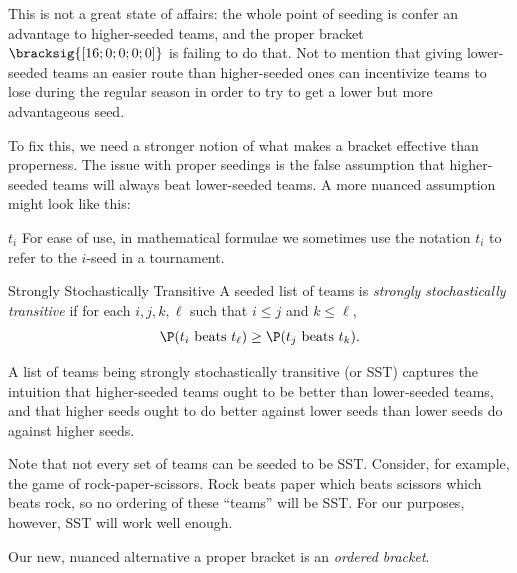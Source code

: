 {This is not a great state of affairs: the whole point of seeding is confer an advantage to higher-seeded teams, and the proper bracket $\bracksig{[16; 0; 0; 0; 0]}$ is failing to do that. Not to mention that giving lower-seeded teams an easier route than higher-seeded ones can incentivize teams to lose during the regular season in order to try to get a lower but more advantageous seed.

To fix this, we need a stronger notion of what makes a bracket effective than properness. The issue with proper seedings is the false assumption that higher-seeded teams will always beat lower-seeded teams. A more nuanced assumption might look like this:


\begin{definition}{$t_i$}{}
    For ease of use, in mathematical formulae we sometimes use the notation $t_i$ to refer to the $i$-seed in a tournament.
\end{definition}

\begin{definition}{Strongly Stochastically Transitive}{}
    A seeded list of teams is \textit{strongly stochastically transitive} if for each $i, j, k, \ell$ such that $i \leq j$ and $k \leq \ell$, $$\P(t_i \textrm{ beats } t_\ell) \geq \P(t_j \textrm{ beats } t_k).$$
\end{definition}

A list of teams being strongly stochastically transitive (or SST) captures the intuition that higher-seeded teams ought to be better than lower-seeded teams, and that higher seeds ought to do better against lower seeds than lower seeds do against higher seeds. 



Note that not every set of teams can be seeded to be SST. Consider, for example, the game of rock-paper-scissors. Rock beats paper which beats scissors which beats rock, so no ordering of these ``teams'' will be SST. For our purposes, however, SST will work well enough.

Our new, nuanced alternative a proper bracket is an \textit{ordered bracket}.

}
